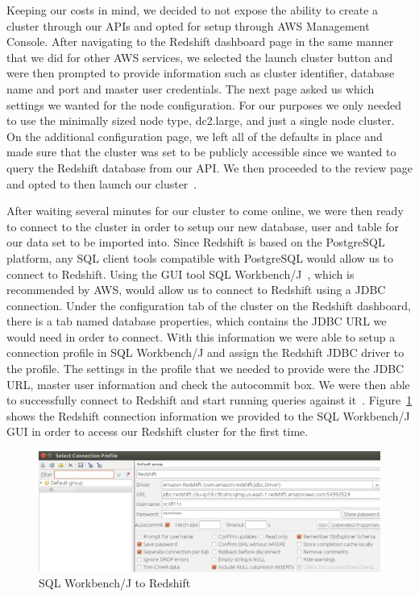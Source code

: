 Keeping our costs in mind, we decided to not expose the ability to create a 
cluster through our APIs and opted for setup through AWS Management Console. 
After navigating to the Redshift dashboard page in the same manner that we did 
for other AWS services, we selected the launch cluster button and were then 
prompted to provide information such as cluster identifier, database name and 
port and master user credentials. The next page asked us which settings we 
wanted for the node configuration. For our purposes we only needed to use the 
minimally sized node type, dc2.large, and just a single node cluster. On the 
additional configuration page, we left all of the defaults in place and made 
sure that the cluster was set to be publicly accessible since we wanted to 
query the Redshift database from our API. We then proceeded to the review page 
and opted to then launch our 
cluster~\cite{hid-sp18-521-redshift-gettingstarted}. 

After waiting several minutes for our cluster to come online, we were then 
ready to connect to the cluster in order to setup our new database, user and 
table for our data set to be imported into. Since Redshift is based on the 
PostgreSQL platform, any SQL client tools compatible with PostgreSQL would 
allow us to connect to Redshift. Using the GUI tool 
SQL Workbench/J~\cite{hid-sp18-521-sqlworkbenchj}, which is recommended by 
AWS, would allow us to connect to Redshift using a JDBC connection. Under the 
configuration tab of the cluster on the Redshift dashboard, there is a tab 
named database properties, which contains the JDBC URL we would need in order 
to connect. With this information we were able to setup a connection profile 
in SQL Workbench/J and assign the Redshift JDBC driver to the profile. The 
settings in the profile that we needed to provide were the JDBC URL, master 
user information and check the autocommit box. We were then able to 
successfully connect to Redshift and start running queries against 
it~\cite{hid-sp18-521-redshift-gettingstarted}. Figure~\ref{f:sqlwkbench} 
shows the Redshift connection information we provided to the SQL
Workbench/J GUI in order to access our Redshift cluster for the first time.

\begin{figure}[!ht]
  \centering\includegraphics[width=\columnwidth]{images/sqlwkbench.png}
  \caption{SQL Workbench/J to Redshift}\label{f:sqlwkbench}
\end{figure}  

